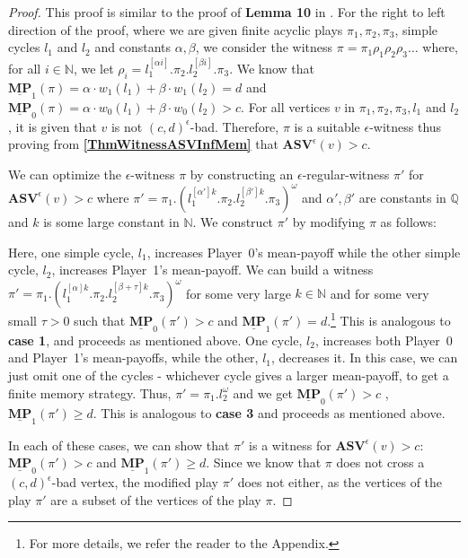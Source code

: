 \begin{proof}
This proof is similar to the proof of \textbf{Lemma 10} in \cite{FGR20}. 
For the right to left direction of the proof, where we are given finite acyclic plays $\pi_1, \pi_2, \pi_3$, simple cycles $l_1$ and $l_2$ and constants $\alpha, \beta$, we consider the witness $\pi = \pi_1\rho_1\rho_2\rho_3\dots$ where, for all $i \in \mathbb{N}$, we let $\rho_i = l_1^{[\alpha i]}.\pi_2.l_2^{[\beta i]}.\pi_3$. 
We know that $\underline{\mathbf{MP}}_1(\pi) = \alpha \cdot w_1(l_1) + \beta \cdot w_1(l_2) = d$ and $\underline{\mathbf{MP}}_0(\pi) = \alpha \cdot w_0(l_1) + \beta \cdot w_0(l_2) > c$. For all vertices $v$ in $\pi_1, \pi_2, \pi_3, l_1$ and $l_2$, it is given that $v$ is not $(c,d)^\epsilon$-bad. 
Therefore, $\pi$ is a suitable $\epsilon$-witness thus proving from \textbf{\cref{ThmWitnessASVInfMem}} that $\mathbf{ASV}^{\epsilon}(v) > c$.

We can optimize the $\epsilon$-witness $\pi$ by constructing an $\epsilon$-regular-witness $\pi'$ for $\mathbf{ASV}^{\epsilon}(v) > c$ where $\pi' = \pi_1.(l_1^{[\alpha']k}.\pi_2.l_2^{[\beta']k}.\pi_3)^{\omega}$ and $\alpha', \beta'$ are constants in $\mathbb{Q}$ and $k$ is some large constant in $\mathbb{N}$. We construct $\pi'$ by modifying $\pi$ as follows:
\begin{caseof}
    Here, one simple cycle, $l_1$, increases Player~0's mean-payoff while the other simple cycle, $l_2$, increases Player~1's mean-payoff. We can build a witness $\pi' = \pi_1.(l_1^{[\alpha]k}.\pi_2.l_2^{[\beta+\tau]k}.\pi_3)^{\omega}$ for some very large $k \in \mathbb{N}$ and for some very small $\tau > 0$ such that $\underline{\mathbf{MP}}_0(\pi') > c$ and $\underline{\mathbf{MP}}_1(\pi') = d$.\footnote{For more details, we refer the reader to the Appendix.}
    This is analogous to \textbf{case 1}, and proceeds as mentioned above.
    One cycle, $l_2$, increases both Player~0 and Player~1's mean-payoffs, while the other, $l_1$, decreases it. In this case, we can just omit one of the cycles - whichever cycle gives a larger mean-payoff, to get a finite memory strategy. Thus, $\pi' = \pi_1.l_2^{\omega}$ and we get $\underline{\mathbf{MP}}_0(\pi') > c$ , $\underline{\mathbf{MP}}_1(\pi') \geqslant d$.
    This is analogous to \textbf{case 3} and proceeds as mentioned above.
\end{caseof}
In each of these cases, we can show that $\pi'$ is a witness for $\mathbf{ASV}^{\epsilon}(v) > c$: $\underline{\mathbf{MP}}_0(\pi') > c$ and $\underline{\mathbf{MP}}_1(\pi') \geqslant d$.
Since we know that $\pi$ does not cross a $(c,d)^{\epsilon}$-bad vertex, the modified play $\pi'$ does not either, as the vertices of the play $\pi'$ are a subset of the vertices of the play $\pi$. 


\end{proof}

